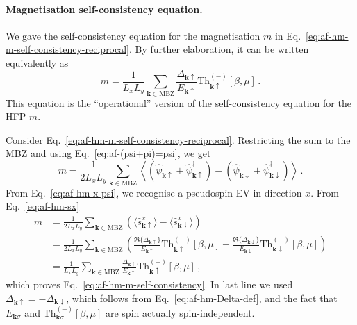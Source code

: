 \paragraph{Magnetisation self-consistency equation.}

We gave the self-consistency equation for the magnetisation $m$ in Eq.~\eqref{eq:af-hm-m-self-consistency-reciprocal}. By further elaboration, it can be written equivalently as
\begin{equation}\label{eq:af-hm-m-self-consistency}
	m = \frac{1}{L_x L_y} \sum_{\mathbf{k} \in \mathrm{MBZ}} \frac{\Delta_{\mathbf{k}\uparrow}}{E_{\mathbf{k}\uparrow}} \mathrm{Th}_{\mathbf{k}\uparrow}^{(-)}[\beta,\mu] \, .
\end{equation}
This equation is the ``operational'' version of the self-consistency equation for the HFP $m$.

\begin{tabproof}
	
	Consider Eq.~\eqref{eq:af-hm-m-self-consistency-reciprocal}. Restricting the sum to the MBZ and using Eq.~\eqref{eq:af-(psi+pi)=psi}, we get
	\[
	m = \frac{1}{2L_xL_y} \sum_{\mathbf{k} \in \mathrm{MBZ}} \left\langle
	\left(\hat \psi_{\mathbf{k}\uparrow} + \hat \psi_{\mathbf{k}\uparrow}^\dagger\right) - \left(\hat \psi_{\mathbf{k}\downarrow} + \hat \psi_{\mathbf{k}\downarrow}^\dagger\right)
	\right\rangle \, .
	\]
	From Eq.~\eqref{eq:af-hm-x-psi}, we recognise a pseudospin EV in direction $x$. From Eq.~\eqref{eq:af-hm-sx}
	\[
	\begin{aligned}
		m &= \frac{1}{2L_xL_y} \sum_{\mathbf{k} \in \mathrm{MBZ}} \left(
		\langle
		\hat s_{\mathbf{k}\uparrow}^x
		\rangle
		- 
		\langle
		\hat s_{\mathbf{k}\downarrow}^x
		\rangle
		\right) \\
		&= \frac{1}{2L_xL_y} \sum_{\mathbf{k} \in \mathrm{MBZ}} \left(
		\frac{\Re\lbrace\Delta_{\mathbf{k}\uparrow}\rbrace}{E_{\mathbf{k}\uparrow}} \mathrm{Th}_{\mathbf{k}\uparrow}^{(-)}[\beta,\mu] - \frac{\Re\lbrace\Delta_{\mathbf{k}\downarrow}\rbrace}{E_{\mathbf{k}\downarrow}} \mathrm{Th}_{\mathbf{k}\downarrow}^{(-)}[\beta,\mu]
		\right) \\
		&= \frac{1}{L_x L_y} \sum_{\mathbf{k} \in \mathrm{MBZ}} \frac{\Delta_{\mathbf{k}\uparrow}}{E_{\mathbf{k}\uparrow}} \mathrm{Th}_{\mathbf{k}\uparrow}^{(-)}[\beta,\mu] \, ,
	\end{aligned}
	\]
	which proves Eq.~\eqref{eq:af-hm-m-self-consistency}. In last line we used $\Delta_{\mathbf{k}\uparrow} = -\Delta_{\mathbf{k}\downarrow}$, which follows from Eq.~\eqref{eq:af-hm-Delta-def}, and the fact that $E_{\mathbf{k}\sigma}$ and $\mathrm{Th}_{\mathbf{k}\sigma}^{(-)}[\beta,\mu]$ are spin actually spin-independent.
\end{tabproof}


